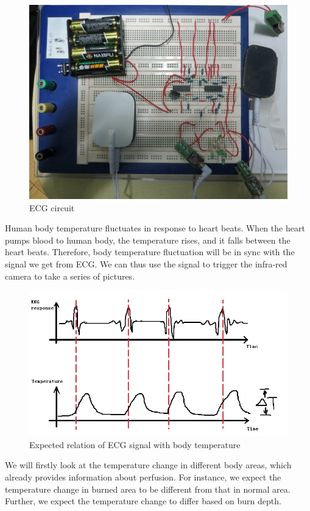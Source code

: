 \documentclass[paper=letter, fontsize=11pt]{scrartcl}
\numberwithin{equation}{section}		%
\numberwithin{figure}{section}			%
\numberwithin{table}{section}			%
\begin{document}
\begin{figure}[H]
    \centering
        \includegraphics[scale=0.1]{ECG_photo.jpg}
        \caption{ECG circuit}
\end{figure}

Human body temperature fluctuates in response to heart beats. When the heart pumps blood to human body, the temperature rises, 
and it falls between the heart beats. Therefore, body temperature fluctuation will be in sync with the signal we get from 
ECG. We can thus use the signal to trigger the infra-red camera to take a series of pictures. 
\begin{figure}[H]
    \centering
        \includegraphics[scale=0.5]{our_method.jpg}
        \caption{Expected relation of ECG signal with body temperature}
\end{figure}
We will firstly look at the 
temperature change in different body areas, which already provides information about perfusion. For instance, we expect the 
temperature change in burned area to be different from that in normal area. Further, we expect the temperature change to differ 
based on burn depth.
\end{document}
